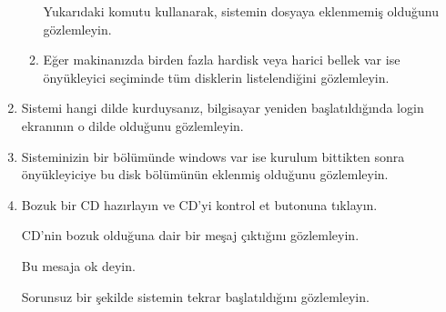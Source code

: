 \documentclass[a4paper,10pt]{article}
\begin{document}
\begin{enumerate}
\begin{enumerate}
	Yukarıdaki komutu kullanarak, sistemin dosyaya eklenmemiş olduğunu gözlemleyin.

    \item Eğer makinanızda birden fazla hardisk veya harici bellek var ise önyükleyici seçiminde tüm disklerin listelendiğini gözlemleyin.
      \end{enumerate}

\item Sistemi hangi dilde kurduysanız, bilgisayar yeniden başlatıldığında login ekranının o dilde olduğunu gözlemleyin.

 \item Sisteminizin bir bölümünde windows var ise kurulum bittikten sonra önyükleyiciye bu disk bölümünün eklenmiş olduğunu gözlemleyin.
\item Bozuk bir CD hazırlayın ve CD'yi kontrol et butonuna tıklayın.

CD'nin bozuk olduğuna dair bir meşaj çıktığını gözlemleyin.

Bu mesaja ok deyin.

Sorunsuz bir şekilde sistemin tekrar başlatıldığını gözlemleyin.

\end{enumerate}
\end{document}
